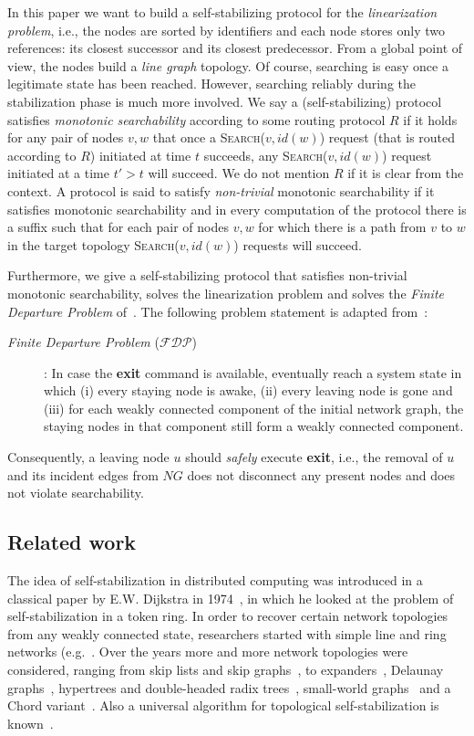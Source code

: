 \documentclass[a4paper,USenglish]{lipics}
\newcommand{\search}[1]{\textsc{Search(\ensuremath{#1})}\xspace}
\newcommand{\fdp}{$\mathcal{FDP}$\xspace}
\begin{document}
In this paper we want to build a self-stabilizing protocol for the \emph{linearization problem}, i.e., the nodes are sorted by identifiers and each node stores only two references: its closest successor and its closest predecessor.
From a global point of view, the nodes build a \emph{line graph} topology.
Of course, searching is easy once a legitimate state has been reached.
However, searching reliably during the stabilization phase is much more involved.
We say a (self-stabilizing) protocol satisfies \emph{monotonic searchability} according to some routing protocol $R$ if it holds for any pair of nodes $v,w$ that once a \search{v,id(w)} request (that is routed according to $R$) initiated at time $t$ succeeds, any \search{v,id(w)} request initiated at a time $t' > t$ will succeed.
We do not mention $R$ if it is clear from the context.
A protocol is said to satisfy \emph{non-trivial} monotonic searchability if it satisfies monotonic searchability and in every computation of the protocol there is a suffix such that for each pair of nodes $v,w$ for which there is a path from $v$ to $w$ in the target topology \search{v,id(w)} requests will succeed.

Furthermore, we give a self-stabilizing protocol that satisfies non-trivial monotonic searchability, solves the linearization problem and solves the \emph{Finite Departure Problem} of~\cite{departure1}. The following problem statement is adapted from~\cite{KoutsopoulosSS15}:
\begin{description}
\item[\emph{Finite Departure Problem} (\fdp)]: In case the \textbf{exit} command is available, eventually reach a system state in which (i) every staying node is awake, (ii) every leaving node is gone and (iii) for each weakly connected component of the initial network graph, the staying nodes in that component still form a weakly connected component.
\end{description}
Consequently, a leaving node $u$ should \emph{safely} execute \textbf{exit}, i.e., the removal of $u$ and its incident edges from $NG$ does not disconnect any present nodes and does not violate searchability.


\subsection{Related work}


The idea of self-stabilization in distributed computing was introduced in a classical paper by E.W. Dijkstra in 1974~\cite{Dijkstra74}, in which he looked at the problem of self-stabilization in a token ring. 
In order to recover certain network topologies from any weakly connected state, researchers started with simple line and ring networks (e.g.~\cite{ShakerR05,self-stabilizing-list,self-stabilizing-list2}.
Over the years more and more network topologies were considered, ranging from skip lists and skip graphs~\cite{corona,JRSST09}, to expanders~\cite{DolevT2013}, Delaunay graphs~\cite{JacobRSS2012}, hypertrees and double-headed radix trees~\cite{DolevK08, AspnesW07}, small-world graphs~\cite{KniesburgesKS12} and a Chord variant~\cite{rechord}. 
Also a universal algorithm for topological self-stabilization is known~\cite{DBLP:journals/tcs/BernsGP13}.
\end{document}
